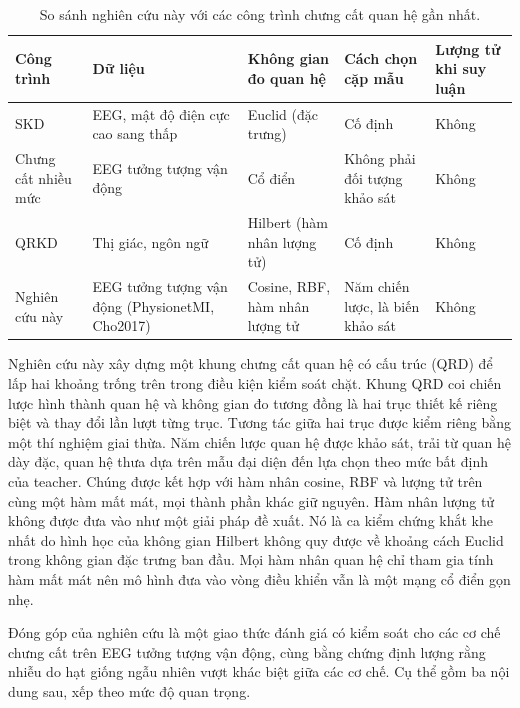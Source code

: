 \begin{table}[!htbp]
\centering
\caption{So sánh nghiên cứu này với các công trình chưng cất quan hệ gần nhất.}
\label{tab:sosanhcongtrinh}
\small
\begin{tabular}{>{\raggedright\arraybackslash}p{3.0cm}>{\raggedright\arraybackslash}p{2.8cm}>{\raggedright\arraybackslash}p{2.6cm}>{\raggedright\arraybackslash}p{2.8cm}>{\raggedright\arraybackslash}p{1.9cm}}
\toprule
\textbf{Công trình} & \textbf{Dữ liệu} & \textbf{Không gian đo quan hệ} & \textbf{Cách chọn cặp mẫu} & \textbf{Lượng tử khi suy luận} \\
\midrule
SKD \cite{huang2024enhancing} & EEG, mật độ điện cực cao sang thấp & Euclid (đặc trưng) & Cố định & Không \\
Chưng cất nhiều mức \cite{wu2026multilevel} & EEG tưởng tượng vận động & Cổ điển & Không phải đối tượng khảo sát & Không \\
QRKD \cite{liu2025quantum} & Thị giác, ngôn ngữ & Hilbert (hàm nhân lượng tử) & Cố định & Không \\
Nghiên cứu này & EEG tưởng tượng vận động (PhysionetMI, Cho2017) & Cosine, RBF, hàm nhân lượng tử & Năm chiến lược, là biến khảo sát & Không \\
\bottomrule
\end{tabular}
\end{table}

Nghiên cứu này xây dựng một khung chưng cất quan hệ có cấu trúc (QRD) để
lấp hai khoảng trống trên trong điều kiện kiểm soát chặt. Khung QRD coi
chiến lược hình thành quan hệ và không gian đo tương đồng là hai trục thiết
kế riêng biệt và thay đổi lần lượt từng trục. Tương tác giữa hai trục được
kiểm riêng bằng một thí nghiệm giai thừa. Năm chiến lược quan hệ được khảo sát, trải từ quan hệ dày đặc, quan hệ thưa
dựa trên mẫu đại diện đến lựa chọn theo mức bất định của teacher. Chúng được
kết hợp với hàm nhân cosine, RBF và lượng tử trên cùng một hàm mất mát, mọi
thành phần khác giữ nguyên. Hàm nhân lượng tử không
được đưa vào như một giải pháp đề xuất. Nó là ca kiểm chứng khắt khe nhất
do hình học của không gian Hilbert không quy được về khoảng cách Euclid
trong không gian đặc trưng ban đầu. Mọi hàm nhân quan hệ chỉ tham gia tính
hàm mất mát nên mô hình đưa vào vòng điều khiển vẫn là một mạng cổ điển gọn
nhẹ.

Đóng góp của nghiên cứu là một giao thức đánh giá có kiểm soát cho các cơ
chế chưng cất trên EEG tưởng tượng vận động, cùng bằng chứng định lượng
rằng nhiễu do hạt giống ngẫu nhiên vượt khác biệt giữa các cơ chế. Cụ thể gồm ba nội dung sau, xếp theo mức độ quan trọng.

